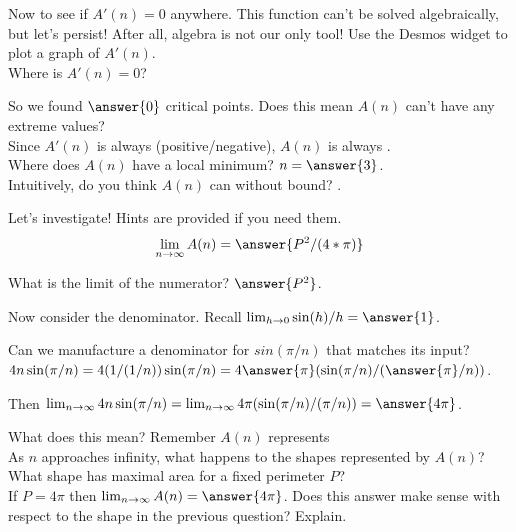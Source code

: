 \documentclass[handout,nooutcomes]{ximera}
\begin{document}
\bigskip

Now to see if $A'(n)=0$ anywhere. This function can't be solved algebraically, but let's persist! After all, algebra is not our only tool! Use the Desmos widget to plot a graph of $A'(n)$.\\
Where is $A'(n)=0$?\\ %

\bigskip

So we found $\answer{0}$ critical points. Does this mean $A(n)$ can't have any extreme values?\\ %
Since $A'(n)$ is always (positive/negative), $A(n)$ is always .\\
Where does $A(n)$ have a local minimum? $n = \answer{3}$.\\
Intuitively, do you think $A(n)$ can  without bound? .\\ %

\medksip

\begin{exercise}
Let's investigate! Hints are provided if you need them.\\
\[\lim_{n \to \infty}A(n) = \answer{P^2/(4*\pi)}\]
\begin{hint}
	What is the limit of the numerator? $\answer{P^2}$.
\end{hint}
\begin{hint}
  Now consider the denominator. Recall $\lim_{h \to 0} \sin(h)/h = \answer{1}$.
\end{hint}
\begin{hint}
  Can we manufacture a denominator for $sin(\pi/n)$ that matches its input?\\
  $4n\sin(\pi/n) = 4(1/(1/n))\sin(\pi/n) = 4\answer{\pi}(\sin(\pi/n)/(\answer{\pi}/n))$.
\end{hint}
\begin{hint}
  Then $\lim_{n \to \infty} 4n\sin(\pi/n) = \lim_{n \to \infty} 4\pi(\sin(\pi/n)/(\pi/n)) = \answer{4\pi}$.
\end{hint}
\end{exercise}

What does this mean? Remember $A(n)$ represents\\ %
As $n$ approaches infinity, what happens to the shapes represented by $A(n)$?\\ %

What shape has maximal area for a fixed perimeter $P$?\\ %
If $P = 4\pi$ then $\lim_{n \to \infty} A(n) = \answer{4\pi}$. Does this answer make sense with respect to the shape in the previous question? Explain.\\ %
\end{document}
